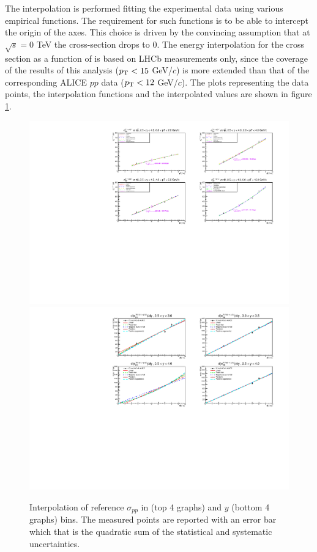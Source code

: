 The interpolation is performed fitting the experimental data using various empirical functions.
The requirement for such functions is to be able to intercept the origin of the axes.
This choice is driven by the convincing assumption that at $\sqrt{s}=0$ \rm{TeV}  the cross-section drops to $0$.
The energy interpolation for the \upsis cross section as a function of \pt is based on LHCb measurements only, since the  \pt coverage of the results of this analysis ($p_{\rm T} < 15$ GeV/$c$) is more extended than that of the corresponding ALICE $pp$ data ($p_{\rm T} < 12$ GeV/$c$).
The plots representing the data points, the interpolation functions and the interpolated values are shown in figure \ref{fig:sigmapp}.

\begin{figure}[!b]
\begin{center}
\includegraphics[width=0.8\linewidth]{Chapters/Analysis/Figs/sigmapp_vs_pt.pdf}
\includegraphics[width=0.8\linewidth]{Chapters/Analysis/Figs/sigmapp_vs_y.pdf}
\caption{Interpolation of reference $\sigma_{pp}$ in \pt (top 4 graphs) and $y$ (bottom 4 graphs) bins. The measured points are reported with an error bar which that is the quadratic sum of the statistical and systematic uncertainties.}
\label{fig:sigmapp}
\end{center}
\end{figure}

